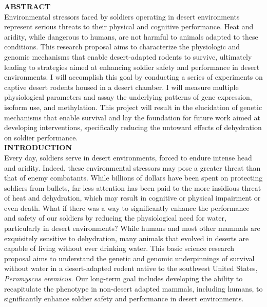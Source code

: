 \documentclass[12pt]{article}
\begin{document}

\pagestyle{empty}

\noindent \textbf{ABSTRACT} \\

Environmental stressors faced by soldiers operating in desert environments represent serious threats to their physical and cognitive performance. Heat and aridity, while dangerous to humans, are not harmful to animals adapted to these conditions. This research proposal aims to characterize the physiologic and genomic mechanisms that enable desert-adapted rodents to survive, ultimately leading to strategies aimed at enhancing soldier safety and performance in desert environments. I will accomplish this goal by conducting a series of experiments on captive desert rodents housed in a desert chamber. I will measure multiple physiological parameters and assay the underlying patterns of gene expression, isoform use, and methylation. This project will result in the elucidation of genetic mechanisms that enable survival and lay the foundation for future work aimed at developing interventions, specifically reducing the untoward effects of dehydration on soldier performance.  \\


\noindent \textbf{INTRODUCTION} \\


Every day, soldiers serve in desert environments, forced to endure intense head and aridity. Indeed, these environmental stressors may pose a greater threat than that of enemy combatants. While billions of dollars have been spent on protecting soldiers from bullets, far less attention has been paid to the more insidious threat of heat and dehydration, which may result in cognitive or physical impairment or even death. What if there was a way to significantly enhance the performance and safety of our soldiers by reducing the physiological need for water, particularly in desert environments? While humans and most other mammals are exquisitely sensitive to dehydration, many animals that evolved in deserts are capable of living without ever drinking water. This basic science research proposal aims to understand the genetic and genomic underpinnings of survival without water in a desert-adapted rodent native to the southwest United States, \textit{Peromyscus eremicus}. Our long-term goal includes developing the ability to recapitulate the phenotype in non-desert adapted mammals, including humans, to significantly enhance soldier safety and performance in desert environments. \\
\end{document}
